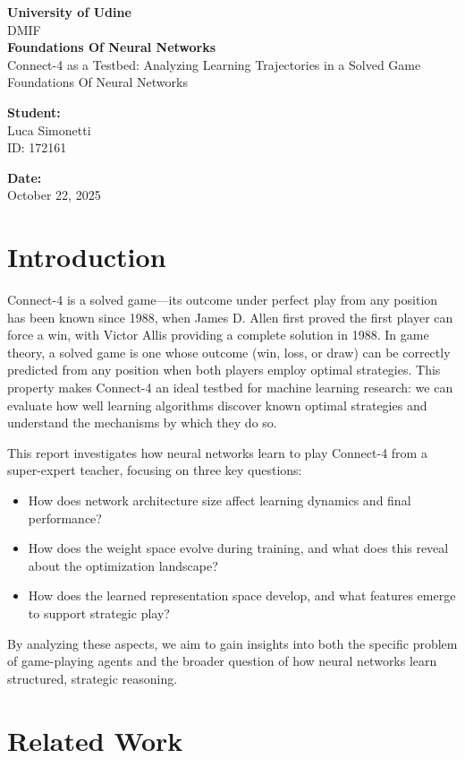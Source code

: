 \documentclass[tikz,12pt,a4paper]{article}
\theoremstyle{definition}
\newcommand{\assignmentcode}{Assignment Code}
\newcommand{\assignmenttitle}{Assignment Title}
\newcommand{\assignmentdate}{\today}
\newcommand{\coursename}{Course Name}
\newcommand{\studentname}{Student Name}
\newcommand{\studentid}{Student ID}
\newcommand{\maketitlepage}{
  \begin{titlepage}
    \centering
    \vspace*{2cm}
    
    
    {\Large \textcolor{UniBrown}{\textbf{University of Udine}}}\\[0.5cm]
    {\large \textcolor{UniBrown}{DMIF}}\\[2cm]
    
    {\huge \textcolor{UniOrange}{\textbf{\assignmentcode}}}\\[0.5cm]
    {\Large \textcolor{UniBrown}{\assignmenttitle}}\\[1.5cm]
    
    {\large \textcolor{UniBrown}{\coursename}}\\[2cm]
    
    \begin{minipage}{0.4\textwidth}
      \begin{flushleft}
        \textcolor{UniBrown}{\textbf{Student:}}\\
        \studentname\\
        ID: \studentid
      \end{flushleft}
    \end{minipage}
    \hfill
    \begin{minipage}{0.4\textwidth}
      \begin{flushright}
        \textcolor{UniBrown}{\textbf{Date:}}\\
        \assignmentdate
      \end{flushright}
    \end{minipage}
    
    \vfill
  \end{titlepage}
}
\renewcommand{\assignmentcode}{Foundations Of Neural Networks}
\renewcommand{\assignmenttitle}{Connect-4 as a Testbed: Analyzing Learning Trajectories in a Solved Game}
\renewcommand{\assignmentdate}{October 22, 2025}
\renewcommand{\coursename}{Foundations Of Neural Networks}
\renewcommand{\studentname}{Luca Simonetti}
\renewcommand{\studentid}{172161}
\begin{document}
\maketitlepage

\tableofcontents
\newpage


\section{Introduction}

Connect-4 is a solved game—its outcome under perfect play from any position has been known since 1988, when James D. Allen first proved the first player can force a win, with Victor Allis providing a complete solution in 1988. In game theory, a solved game is one whose outcome (win, loss, or draw) can be correctly predicted from any position when both players employ optimal strategies. This property makes Connect-4 an ideal testbed for machine learning research: we can evaluate how well learning algorithms discover known optimal strategies and understand the mechanisms by which they do so.

This report investigates how neural networks learn to play Connect-4 from a super-expert teacher, focusing on three key questions:
\begin{itemize}
    \item How does network architecture size affect learning dynamics and final performance?
    \item How does the weight space evolve during training, and what does this reveal about the optimization landscape?
    \item How does the learned representation space develop, and what features emerge to support strategic play?
\end{itemize}

By analyzing these aspects, we aim to gain insights into both the specific problem of game-playing agents and the broader question of how neural networks learn structured, strategic reasoning.

\section{Related Work}
\end{document}
